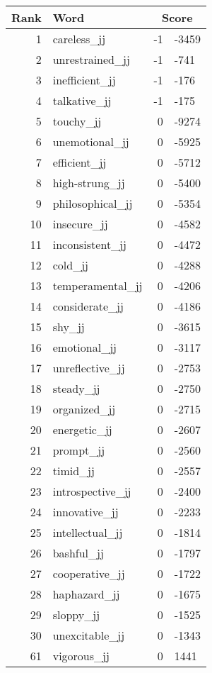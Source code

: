 \begin{longtable}[!htbp]{| rlr@{.}l |}
    \hline
    \textbf{Rank} & \textbf{Word} & \multicolumn{2}{c|}{\textbf{Score}} \\
    \hline
    \endhead
    1 & careless\_jj & -1 & -3459 \\
    2 & unrestrained\_jj & -1 & -741 \\
    3 & inefficient\_jj & -1 & -176 \\
    4 & talkative\_jj & -1 & -175 \\
    5 & touchy\_jj & 0 & -9274 \\
    6 & unemotional\_jj & 0 & -5925 \\
    7 & efficient\_jj & 0 & -5712 \\
    8 & high-strung\_jj & 0 & -5400 \\
    9 & philosophical\_jj & 0 & -5354 \\
    10 & insecure\_jj & 0 & -4582 \\
    11 & inconsistent\_jj & 0 & -4472 \\
    12 & cold\_jj & 0 & -4288 \\
    13 & temperamental\_jj & 0 & -4206 \\
    14 & considerate\_jj & 0 & -4186 \\
    15 & shy\_jj & 0 & -3615 \\
    16 & emotional\_jj & 0 & -3117 \\
    17 & unreflective\_jj & 0 & -2753 \\
    18 & steady\_jj & 0 & -2750 \\
    19 & organized\_jj & 0 & -2715 \\
    20 & energetic\_jj & 0 & -2607 \\
    21 & prompt\_jj & 0 & -2560 \\
    22 & timid\_jj & 0 & -2557 \\
    23 & introspective\_jj & 0 & -2400 \\
    24 & innovative\_jj & 0 & -2233 \\
    25 & intellectual\_jj & 0 & -1814 \\
    26 & bashful\_jj & 0 & -1797 \\
    27 & cooperative\_jj & 0 & -1722 \\
    28 & haphazard\_jj & 0 & -1675 \\
    29 & sloppy\_jj & 0 & -1525 \\
    30 & unexcitable\_jj & 0 & -1343 \\
    61 & vigorous\_jj & 0 & 1441 \\

\end{longtable}
